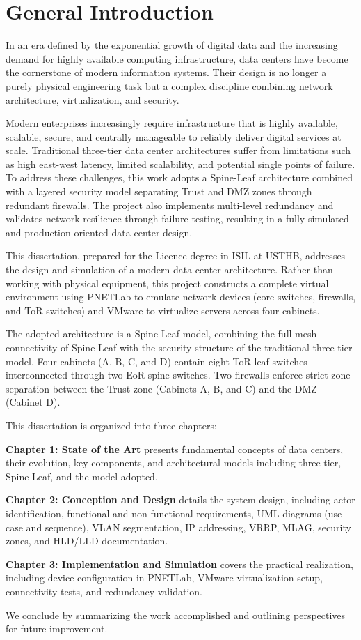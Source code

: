 \chapter*{General Introduction}

In an era defined by the exponential growth of digital data and the increasing demand for highly available computing infrastructure, data centers have become the cornerstone of modern information systems. Their design is no longer a purely physical engineering task but a complex discipline combining network architecture, virtualization, and security.

Modern enterprises increasingly require infrastructure that is highly available, scalable, secure, and centrally manageable to reliably deliver digital services at scale. Traditional three-tier data center architectures suffer from limitations such as high east-west latency, limited scalability, and potential single points of failure. To address these challenges, this work adopts a Spine-Leaf architecture combined with a layered security model separating Trust and DMZ zones through redundant firewalls. The project also implements multi-level redundancy and validates network resilience through failure testing, resulting in a fully simulated and production-oriented data center design.

This dissertation, prepared for the Licence degree in ISIL at USTHB, addresses the design and simulation of a modern data center architecture. Rather than working with physical equipment, this project constructs a complete virtual environment using PNETLab to emulate network devices (core switches, firewalls, and ToR switches) and VMware to virtualize servers across four cabinets.

The adopted architecture is a Spine-Leaf model, combining the full-mesh connectivity of Spine-Leaf with the security structure of the traditional three-tier model. Four cabinets (A, B, C, and D) contain eight ToR leaf switches interconnected through two EoR spine switches. Two firewalls enforce strict zone separation between the Trust zone (Cabinets A, B, and C) and the DMZ (Cabinet D).

This dissertation is organized into three chapters:

\textbf{Chapter 1: State of the Art} presents fundamental concepts of data centers, their evolution, key components, and architectural models including three-tier, Spine-Leaf, and the model adopted.

\textbf{Chapter 2: Conception and Design} details the system design, including actor identification, functional and non-functional requirements, UML diagrams (use case and sequence), VLAN segmentation, IP addressing, VRRP, MLAG, security zones, and HLD/LLD documentation.

\textbf{Chapter 3: Implementation and Simulation} covers the practical realization, including device configuration in PNETLab, VMware virtualization setup, connectivity tests, and redundancy validation.

We conclude by summarizing the work accomplished and outlining perspectives for future improvement.